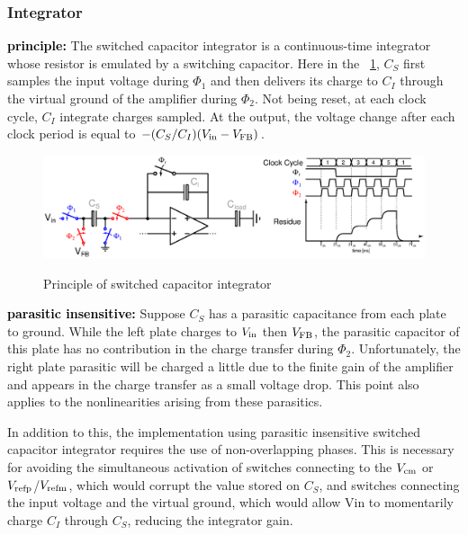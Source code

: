 	\subsubsection{Integrator}              %
\textbf{\textcolor{black}{principle:}}
The switched capacitor integrator is a continuous-time integrator whose resistor is emulated by a switching capacitor. Here in the \figurename~\ref{fig:sigma-delta-integration}, $C_S$ first samples the input voltage during $\Phi_1$ and then delivers its charge to $C_I$ through the virtual ground of the amplifier during $\Phi_2$. Not being reset, at each clock cycle, $C_I$ integrate charges sampled. At the output, the voltage change after each clock period is equal to $-(C_S/C_I)(V_{\rm in} - V_{\rm FB})$.

\begin{figure}[htp]
	\centering
	\includegraphics[width=\textwidth]{Chapter4/Figs/sigma-delta-integration.ps}
	\begin{subfigure}[b]{0.48\textwidth}
		\centering
	\end{subfigure}
	\begin{subfigure}[b]{0.48\textwidth}
		\centering
	\end{subfigure}
	\caption{Principle of switched capacitor integrator}
	\label{fig:sigma-delta-integration}
\end{figure}

\textbf{\textcolor{black}{parasitic insensitive:}}
Suppose $C_S$ has a parasitic capacitance from each plate to ground. While the left plate charges to $V_{\rm in}$ then $V_{\rm FB}$, the parasitic capacitor of this plate has no contribution in the charge transfer during $\Phi_2$. Unfortunately, the right plate parasitic will be charged a little due to the finite gain of the amplifier and appears in the charge transfer as a small voltage drop. This point also applies to the nonlinearities arising from these parasitics.

In addition to this, the implementation using parasitic insensitive switched capacitor integrator requires the use of non-overlapping phases. This is necessary for avoiding the simultaneous activation of switches connecting to the $V_{\rm cm}$ or $V_{\rm refp}$/$V_{\rm refm}$, which would corrupt the value stored on $C_S$, and switches connecting the input voltage and the virtual ground, which would allow Vin to momentarily charge $C_I$ through $C_S$, reducing the integrator gain. 


